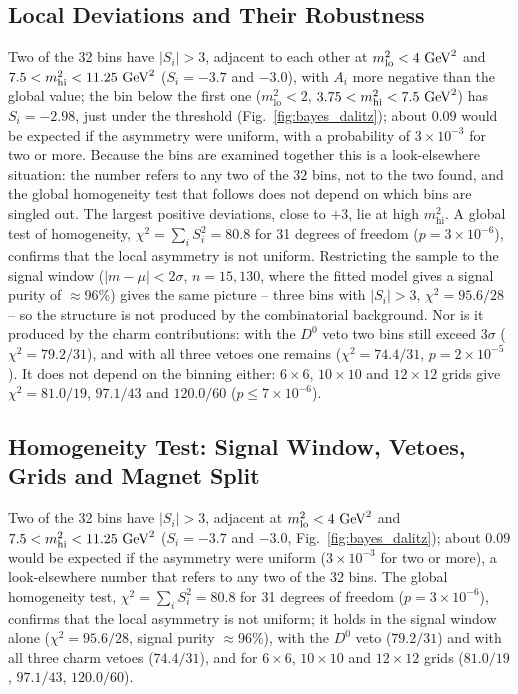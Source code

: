 \subsection{Local Deviations and Their Robustness}
Two of the 32 bins have $|S_i|>3$, adjacent to each other at $m^2_{\mathrm{lo}}<4\,\,\text{Ge\hspace{-.08em}V}^2$ and $7.5<m^2_{\mathrm{hi}}<11.25\,\,\text{Ge\hspace{-.08em}V}^2$ ($S_i=-3.7$ and $-3.0$), with $A_i$ more negative than the global value; the bin below the first one ($m^2_{\mathrm{lo}}<2$, $3.75<m^2_{\mathrm{hi}}<7.5\,\,\text{Ge\hspace{-.08em}V}^2$) has $S_i=-2.98$, just under the threshold (Fig.~\ref{fig:bayes_dalitz}); about $0.09$ would be expected if the asymmetry were uniform, with a probability of $3\times10^{-3}$ for two or more. Because the bins are examined together this is a look-elsewhere situation: the number refers to any two of the $32$ bins, not to the two found, and the global homogeneity test that follows does not depend on which bins are singled out. The largest positive deviations, close to $+3$, lie at high $m^2_{\mathrm{hi}}$. A global test of homogeneity, $\chi^2=\sum_i S_i^2=80.8$ for 31 degrees of freedom ($p=3\times10^{-6}$), confirms that the local asymmetry is not uniform. Restricting the sample to the signal window ($|m-\mu|<2\sigma$, $n=15{,}130$, where the fitted model gives a signal purity of $\approx$96\%) gives the same picture -- three bins with $|S_i|>3$, $\chi^2=95.6/28$ -- so the structure is not produced by the combinatorial background. Nor is it produced by the charm contributions: with the $D^0$ veto two bins still exceed $3\sigma$ ($\chi^2=79.2/31$), and with all three vetoes one remains ($\chi^2=74.4/31$, $p=2\times10^{-5}$). It does not depend on the binning either: $6\times6$, $10\times10$ and $12\times12$ grids give $\chi^2=81.0/19$, $97.1/43$ and $120.0/60$ ($p\leq7\times10^{-6}$).

\subsection{Homogeneity Test: Signal Window, Vetoes, Grids and Magnet Split}
Two of the 32 bins have $|S_i|>3$, adjacent at $m^2_{\mathrm{lo}}<4\,\,\text{Ge\hspace{-.08em}V}^2$ and $7.5<m^2_{\mathrm{hi}}<11.25\,\,\text{Ge\hspace{-.08em}V}^2$ ($S_i=-3.7$ and $-3.0$, Fig.~\ref{fig:bayes_dalitz}); about $0.09$ would be expected if the asymmetry were uniform ($3\times10^{-3}$ for two or more), a look-elsewhere number that refers to any two of the 32 bins. The global homogeneity test, $\chi^2=\sum_iS_i^2=80.8$ for 31 degrees of freedom ($p=3\times10^{-6}$), confirms that the local asymmetry is not uniform; it holds in the signal window alone ($\chi^2=95.6/28$, signal purity $\approx$96\%), with the $D^0$ veto ($79.2/31$) and with all three charm vetoes ($74.4/31$), and for $6\times6$, $10\times10$ and $12\times12$ grids ($81.0/19$, $97.1/43$, $120.0/60$).


